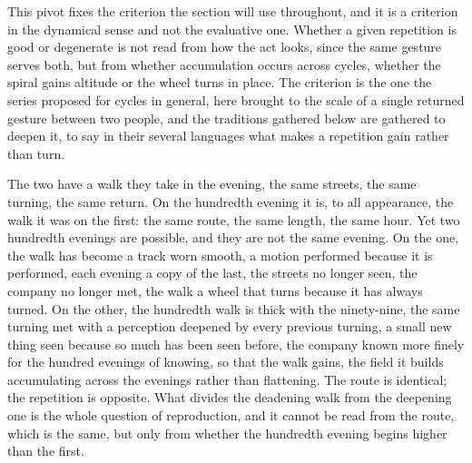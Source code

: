 
This pivot fixes the criterion the section will use throughout, and it is a criterion in the dynamical sense and not the evaluative one. Whether a given repetition is good or degenerate is not read from how the act looks, since the same gesture serves both, but from whether accumulation occurs across cycles, whether the spiral gains altitude or the wheel turns in place. The criterion is the one the series proposed for cycles in general, here brought to the scale of a single returned gesture between two people, and the traditions gathered below are gathered to deepen it, to say in their several languages what makes a repetition gain rather than turn.

\begin{casebox}
The two have a walk they take in the evening, the same streets, the same turning, the same return. On the hundredth evening it is, to all appearance, the walk it was on the first: the same route, the same length, the same hour. Yet two hundredth evenings are possible, and they are not the same evening. On the one, the walk has become a track worn smooth, a motion performed because it is performed, each evening a copy of the last, the streets no longer seen, the company no longer met, the walk a wheel that turns because it has always turned. On the other, the hundredth walk is thick with the ninety-nine, the same turning met with a perception deepened by every previous turning, a small new thing seen because so much has been seen before, the company known more finely for the hundred evenings of knowing, so that the walk gains, the field it builds accumulating across the evenings rather than flattening. The route is identical; the repetition is opposite. What divides the deadening walk from the deepening one is the whole question of reproduction, and it cannot be read from the route, which is the same, but only from whether the hundredth evening begins higher than the first.
\end{casebox}

